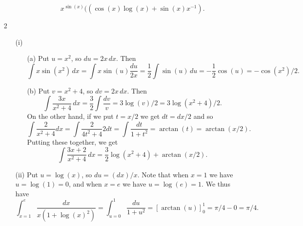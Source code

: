 \documentclass{amsart}
\renewcommand{\:}       {\colon}
\begin{document}
\begin{itemize}
\begin{itemize}
\begin{itemize}
\[           x^{\sin(x)}((\cos(x)\log(x) + \sin(x)x^{-1}).
      \]
    \end{itemize}
  \end{itemize}
 \item[2]
  \begin{itemize}
   \item[(i)]
    \begin{itemize}
     \item[(a)] Put $u=x^2$, so $du=2x\,dx$.  Then
      \[ \int x\sin(x^2)\,dx = 
         \int x\sin(u)\frac{du}{2x} = \frac{1}{2}\int\sin(u)\,du =
         -\frac{1}{2}\cos(u) = -\cos(x^2)/2.
      \]
     \item[(b)] Put $v=x^2+4$, so $dv=2x\,dx$.  Then
      \[ \int \frac{3x}{x^2+4}\,dx = 
         \frac{3}{2}\int\frac{dv}{v} = 3\log(v)/2 = 3\log(x^2+4)/2.
      \]
      On the other hand, if we put $t=x/2$ we get $dt=dx/2$ and so
      \[ \int \frac{2}{x^2+4}dx = 
         \int \frac{2}{4t^2+4}2dt = \int\frac{dt}{1+t^2} = 
         \arctan(t) = \arctan(x/2).
      \]
      Putting these together, we get
      \[ \int\frac{3x+2}{x^2+4}\,dx =
          \frac{3}{2}\log(x^2+4) + \arctan(x/2).
      \]
    \end{itemize}
   \item[(ii)]
    Put $u=\log(x)$, so $du=(dx)/x$.  Note that when $x=1$ we have
    $u=\log(1)=0$, and when $x=e$ we have $u=\log(e)=1$.  We thus have
    \[ \int_{x=1}^e\frac{dx}{x(1+\log(x)^2)} =
       \int_{u=0}^1\frac{du}{1+u^2} = 
       \left[\arctan(u)\right]_0^1 = \pi/4-0 = \pi/4.
    \]


\end{itemize}
\end{itemize}
\end{document}
